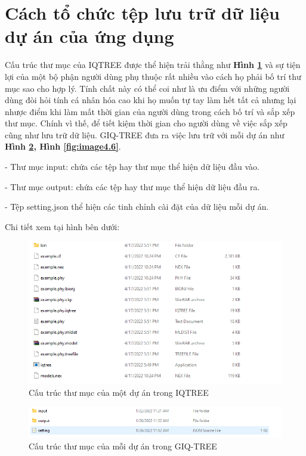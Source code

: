 \documentclass[12pt]{report}
\begin{document}
\section{Cách tổ chức tệp lưu trữ dữ liệu dự án của ứng dụng }
Cấu trúc thư mục của IQTREE được thể hiện trải thằng như  \textbf{Hình \ref{fig:image4.4}} và sự tiện lợi của một bộ phận người dùng phụ thuộc rất nhiều vào cách họ phải bố trí thư mục sao cho hợp lý. Tính chất này có thể coi như là ưu điểm với những người dùng đòi hỏi tính cá nhân hóa cao khi họ muốn tự tay làm hết tất cả nhưng lại nhược điểm khi làm mất thời gian của người dùng trong cách bố trí và sắp xếp thư mục. Chính vì thế, để tiết kiệm thời gian cho người dùng về việc sắp xếp cũng như lưu trữ dữ liệu. GIQ-TREE đưa ra việc lưu trữ với mỗi dự án như \textbf{Hình \ref{fig:image4.5}, Hình \ref{fig:image4.6}}.

- Thư mục input: chứa các tệp hay thư mục thể hiện dữ liệu đầu vào.

- Thư mục output: chứa các tệp hay thư mục thể hiện dữ liệu đầu ra.

- Tệp setting.json thể hiện các tinh chỉnh cài đặt của dữ liệu mỗi dự án.

Chi tiết xem tại hình bên dưới:

\begin{figure}[h]
	\centering
	\includegraphics[scale=1]{Image/4.4.png}
	\caption{Cấu trúc thư mục của một dự án trong IQTREE }
	\label{fig:image4.4}
\end{figure}

\begin{figure}[h]
	\centering
	\includegraphics[scale=1]{Image/4.5.png}
	\caption{Cấu trúc thư mục của mỗi dự án trong GIQ-TREE }
	\label{fig:image4.5}
\end{figure}
\end{document}
